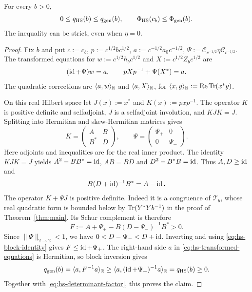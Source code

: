 \begin{proposition}\label{prop:hs-comparison}
For every $b>0$,
\begin{equation}\label{eq:hs-energy-order}
 0\le q_{\rm HS}(b)\le q_{\rm gen}(b),\qquad
 \Phi_{\rm HS}(c_b)\le\Phi_{\rm gen}(b).
\end{equation}
The inequality can be strict, even when $\eta=0$.
\end{proposition}
\begin{proof}
Fix $b$ and put $c:=c_b$, $p:=c^{1/2}bc^{1/2}$, $a:=c^{-1/2}a_0c^{-1/2}$, $\Psi:=\mathcal C_{c^{-1/2}}\eta\mathcal C_{c^{-1/2}}$.
The transformed equations for $w:=c^{1/2}h_bc^{1/2}$ and $X:=c^{1/2}Z_bc^{1/2}$ are
\begin{equation}\label{eq:hs-transformed-equations}
 (\operatorname{id}+\Psi)w=a,\qquad pXp^{-1}+\Psi(X^*)=a.
\end{equation}
The quadratic corrections are $\langle a,w\rangle_{\mathbb R}$ and $\langle a,X\rangle_{\mathbb R}$, for $\langle x,y\rangle_{\mathbb R}:=\operatorname{Re}\operatorname{Tr}(x^*y)$.

On this real Hilbert space let $J(x):=x^*$ and $K(x):=pxp^{-1}$.
The operator $K$ is positive definite and selfadjoint, $J$ is a selfadjoint involution, and $KJK=J$.
Splitting into Hermitian and skew-Hermitian matrices gives
\[
 K=\begin{pmatrix}A&B\\B^*&D\end{pmatrix},\qquad
 \Psi=\begin{pmatrix}\Psi_+&0\\0&\Psi_-\end{pmatrix}.
\]
Here adjoints and inequalities are for the real inner product.
The identity $KJK=J$ yields $A^2-BB^*=\operatorname{id}$, $AB=BD$ and $D^2-B^*B=\operatorname{id}$.
Thus $A,D\ge\operatorname{id}$ and
\begin{equation}\label{eq:hs-block-identity}
 B(D+\operatorname{id})^{-1}B^*=A-\operatorname{id}.
\end{equation}
The operator $K+\Psi J$ is positive definite.
Indeed it is a congruence of $\mathcal T_b$, whose real quadratic form is bounded below by $\operatorname{Tr}(Y^*Yb^{-1})$ in the proof of Theorem~\ref{thm:main}.
Its Schur complement is therefore
\[
 F:=A+\Psi_+-B(D-\Psi_-)^{-1}B^*>0.
\]
Since $\|\Psi\|_{2\to2}<1$, we have $0<D-\Psi_-<D+\operatorname{id}$.
Inverting and using \eqref{eq:hs-block-identity} gives $F\le\operatorname{id}+\Psi_+$.
The right-hand side $a$ in \eqref{eq:hs-transformed-equations} is Hermitian, so block inversion gives
\[
 q_{\rm gen}(b)=\langle a,F^{-1}a\rangle_{\mathbb R}
    \ge\langle a,(\operatorname{id}+\Psi_+)^{-1}a\rangle_{\mathbb R}
    =q_{\rm HS}(b)\ge0.
\]
Together with \eqref{eq:hs-determinant-factor}, this proves the claim.
\end{proof}

